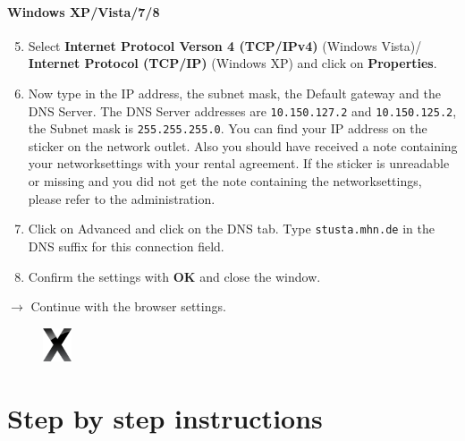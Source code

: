 \documentclass[a4paper,12pt]{scrartcl}
\newcommand{\optemph}[1]{\textbf{#1}}
\begin{document}
\paragraph*{Windows XP/Vista/7/8}
\begin{enumerate}
    \setcounter{enumi}{4}
	\item Select \optemph{Internet Protocol Verson 4 (TCP/IPv4)} (Windows Vista)/ \optemph{Internet Protocol  (TCP/IP)} (Windows XP) and click on \optemph{Properties}.
    \item Now type in the IP address, the subnet mask, the Default gateway and the DNS Server. The DNS Server addresses are \nolinkurl{10.150.127.2} and \nolinkurl{10.150.125.2}, the Subnet mask is \nolinkurl{255.255.255.0}. You can find your IP address on the sticker on the network outlet. Also you should have received a note containing your networksettings with your rental agreement. If the sticker is unreadable or missing and you did not get the note containing the networksettings, please refer to the administration.
    \item Click on Advanced and click on the DNS tab. Type \nolinkurl{stusta.mhn.de} in the DNS suffix for this connection field.
	\item Confirm the settings with \optemph{OK} and close the window.
\end{enumerate}
$\rightarrow$ Continue with the browser settings.



\newpage

\begin{figure}[t!]
    \raggedleft
    \vspace{-20pt}
    \includegraphics[height=1cm,keepaspectratio]{Bilder/OSXLeopard}
    \vspace{-20pt}
\end{figure}

\section*{Step by step instructions}
\end{document}
